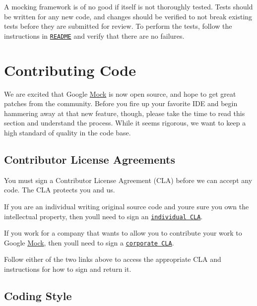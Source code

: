 A mocking framework is of no good if itself is not thoroughly tested. Tests should be written for any new code, and changes should be verified to not break existing tests before they are submitted for review. To perform the tests, follow the instructions in \href{http://code.google.com/p/googlemock/source/browse/trunk/README}{\tt R\+E\+A\+D\+ME} and verify that there are no failures.

\section*{Contributing Code}

We are excited that Google \hyperlink{class_mock}{Mock} is now open source, and hope to get great patches from the community. Before you fire up your favorite I\+DE and begin hammering away at that new feature, though, please take the time to read this section and understand the process. While it seems rigorous, we want to keep a high standard of quality in the code base.

\subsection*{Contributor License Agreements}

You must sign a Contributor License Agreement (C\+LA) before we can accept any code. The C\+LA protects you and us.


\begin{DoxyItemize}
\item If you are an individual writing original source code and you\textquotesingle{}re sure you own the intellectual property, then you\textquotesingle{}ll need to sign an \href{http://code.google.com/legal/individual-cla-v1.0.html}{\tt individual C\+LA}.
\item If you work for a company that wants to allow you to contribute your work to Google \hyperlink{class_mock}{Mock}, then you\textquotesingle{}ll need to sign a \href{http://code.google.com/legal/corporate-cla-v1.0.html}{\tt corporate C\+LA}.
\end{DoxyItemize}

Follow either of the two links above to access the appropriate C\+LA and instructions for how to sign and return it.

\subsection*{Coding Style}


